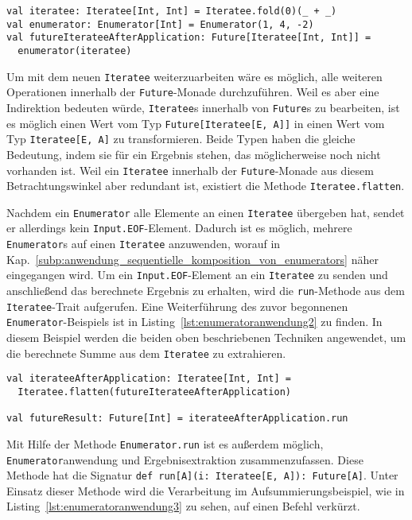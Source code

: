 \documentclass[draft=false
              ,paper=a4
              ,twoside=false
              ,fontsize=11pt
              ,headsepline
              ,BCOR10mm
              ,DIV11
              ]{scrbook}
\begin{document}
\begin{lstlisting}[caption=Anwendung eines Enumerators auf einen Iteratee, label=lst:enumeratoranwendung1]
val iteratee: Iteratee[Int, Int] = Iteratee.fold(0)(_ + _)
val enumerator: Enumerator[Int] = Enumerator(1, 4, -2)
val futureIterateeAfterApplication: Future[Iteratee[Int, Int]] =
  enumerator(iteratee)
\end{lstlisting}


Um mit dem neuen \lstinline|Iteratee| weiterzuarbeiten wäre es möglich, alle weiteren Operationen innerhalb der \lstinline|Future|-Monade durchzuführen.
Weil es aber eine Indirektion bedeuten würde, \lstinline|Iteratee|s innerhalb von \lstinline|Future|s zu bearbeiten, ist es möglich einen Wert vom Typ \lstinline|Future[Iteratee[E, A]]| in einen Wert vom Typ \lstinline|Iteratee[E, A]| zu transformieren.
Beide Typen haben die gleiche Bedeutung, indem sie für ein Ergebnis stehen, das möglicherweise noch nicht vorhanden ist.
Weil ein \lstinline|Iteratee| innerhalb der \lstinline|Future|-Monade aus diesem Betrachtungswinkel aber redundant ist, existiert die Methode \lstinline|Iteratee.flatten|.


Nachdem ein \lstinline|Enumerator| alle Elemente an einen \lstinline|Iteratee| übergeben hat, sendet er allerdings kein \lstinline|Input.EOF|-Element.
Dadurch ist es möglich, mehrere \lstinline|Enumerator|s auf einen \lstinline|Iteratee| anzuwenden, worauf in Kap.~\ref{subp:anwendung_sequentielle_komposition_von_enumerators} näher eingegangen wird.
Um ein \lstinline|Input.EOF|-Element an ein \lstinline|Iteratee| zu senden und anschließend das berechnete Ergebnis zu erhalten, wird die \lstinline|run|-Methode aus dem \lstinline|Iteratee|-Trait aufgerufen.
Eine Weiterführung des zuvor begonnenen \lstinline|Enumerator|-Beispiels ist in Listing~\ref{lst:enumeratoranwendung2} zu finden.
In diesem Beispiel werden die beiden oben beschriebenen Techniken angewendet, um die berechnete Summe aus dem \lstinline|Iteratee| zu extrahieren.

\begin{lstlisting}[caption=Extrahierung des Ergebnisses aus einem Iteratee, label=lst:enumeratoranwendung2]
val iterateeAfterApplication: Iteratee[Int, Int] =
  Iteratee.flatten(futureIterateeAfterApplication)

val futureResult: Future[Int] = iterateeAfterApplication.run
\end{lstlisting}

Mit Hilfe der Methode \lstinline|Enumerator.run| ist es außerdem möglich, \lstinline|Enumerator|anwendung und Ergebnisextraktion zusammenzufassen.
Diese Methode hat die Signatur \lstinline[breaklines=true]|def run[A](i: Iteratee[E, A]): Future[A]|.
Unter Einsatz dieser Methode wird die Verarbeitung im Aufsummierungsbeispiel, wie in Listing~\ref{lst:enumeratoranwendung3} zu sehen, auf einen Befehl verkürzt.
\end{document}
